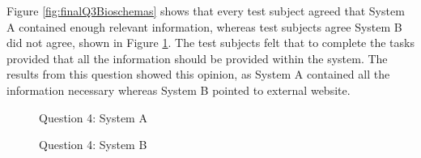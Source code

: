 {%
Figure \ref{fig:finalQ3Bioschemas} shows that every test subject agreed that System A contained enough relevant information, whereas test subjects agree System B did not agree, shown in Figure \ref{fig:finalQ3Kaizen}. The test subjects felt that to complete the tasks provided that all the information should be provided within the system. The results from this question showed this opinion, as System A contained all the information necessary whereas System B pointed to external website.

\begin{figure}[!h]
  \centering
  \begin{minipage}[b]{0.44\textwidth}
    \caption{Question 4: System A}
    \label{fig:finalQ3Bioschemas}
  \end{minipage}
  \hfill
  \begin{minipage}[b]{0.44\textwidth}
    \caption{Question 4: System B}
    \label{fig:finalQ3Kaizen}
  \end{minipage}
\end{figure}

}
